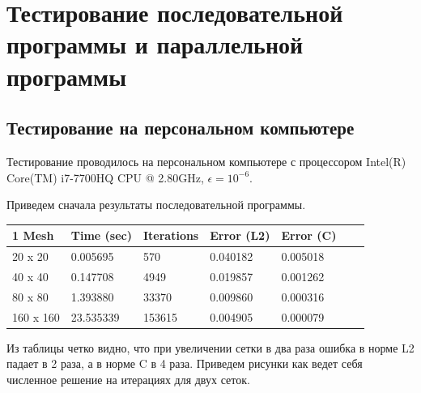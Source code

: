 \documentclass[12pt]{article}
\begin{document}
\newpage

\section{Тестирование последовательной программы и параллельной программы}

\subsection{Тестирование на персональном компьютере}

Тестирование проводилось на персональном компьютере с процессором
Intel(R) Core(TM) i7-7700HQ CPU @ 2.80GHz, $\epsilon = 10^{-6}$.

Приведем сначала результаты последовательной программы.
\begin{center}
\begin{tabular}{lllllll}1
Mesh & Time (sec) & Iterations & Error (L2) & Error (C) \\
\hline
20 x 20 & 0.005695 & 570 & 0.040182 & 0.005018 \\
40 x 40 & 0.147708 & 4949 & 0.019857 & 0.001262 \\
80 x 80 & 1.393880 & 33370 & 0.009860 & 0.000316 \\
160 x 160 & 23.535339 & 153615 & 0.004905 & 0.000079 \\
\hline
\end{tabular}
\end{center}
Из таблицы четко видно, что при увеличении сетки в два раза ошибка в норме L2 падает
в 2 раза, а в норме C в 4 раза. Приведем рисунки как ведет себя
численное решение на итерациях для двух сеток.
\end{document}
